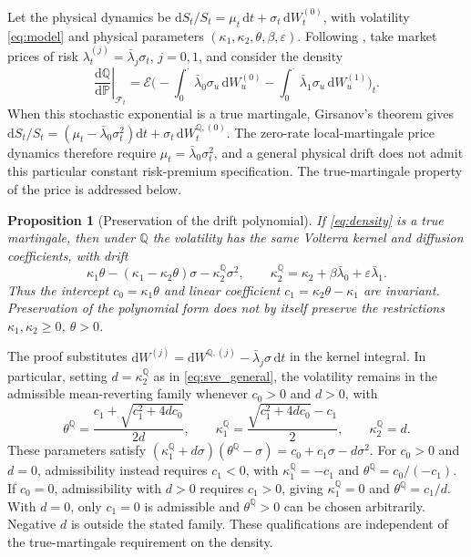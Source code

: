 \documentclass[11pt,a4paper]{article}
\newtheorem{proposition}[theorem]{Proposition}
\theoremstyle{definition}
\newcommand{\D}{\mathrm{d}}
\newcommand{\Q}{\mathbb{Q}}
\renewcommand{\P}{\mathbb{P}}
\newcommand{\F}{\mathcal{F}}
\begin{document}
Let the physical dynamics be $\D S_t/S_t=\mu_t\,\D t+\sigma_t\,\D W^{(0)}_t$, with volatility \eqref{eq:model} and physical parameters $(\kappa_1,\kappa_2,\theta,\beta,\varepsilon)$. Following \citet{SeppRakhmonov2023}, take market prices of risk $\lambda^{(j)}_t=\bar\lambda_j\sigma_t$, $j=0,1$, and consider the density
\begin{equation}\label{eq:density}
\left.\frac{\D\Q}{\D\P}\right|_{\F_t}=\mathcal{E}\Big(-\int_0^\cdot\bar\lambda_0\sigma_u\,\D W^{(0)}_u-\int_0^\cdot\bar\lambda_1\sigma_u\,\D W^{(1)}_u\Big)_t .
\end{equation}
When this stochastic exponential is a true martingale, Girsanov's theorem gives
$\D S_t/S_t=(\mu_t-\bar\lambda_0\sigma_t^2)\D t+\sigma_t\,\D W^{\Q,(0)}_t$.
The zero-rate local-martingale price dynamics therefore require $\mu_t=\bar\lambda_0\sigma_t^2$, and a general physical drift does not admit this particular constant risk-premium specification. The true-martingale property of the price is addressed below.

\begin{proposition}[Preservation of the drift polynomial]\label{prop:closure}
If \eqref{eq:density} is a true martingale, then under $\Q$ the volatility has the same Volterra kernel and diffusion coefficients, with drift
\begin{equation}\label{eq:drift_Q}
\kappa_1\theta-(\kappa_1-\kappa_2\theta)\sigma-\kappa_2^{\Q}\sigma^2,\qquad \kappa_2^{\Q}=\kappa_2+\beta\bar\lambda_0+\varepsilon\bar\lambda_1 .
\end{equation}
Thus the intercept $c_0=\kappa_1\theta$ and linear coefficient $c_1=\kappa_2\theta-\kappa_1$ are invariant. Preservation of the polynomial form does not by itself preserve the restrictions $\kappa_1,\kappa_2\ge0$, $\theta>0$.
\end{proposition}

The proof substitutes $\D W^{(j)}=\D W^{\Q,(j)}-\bar\lambda_j\sigma\,\D t$ in the kernel integral. In particular, setting $d=\kappa_2^{\Q}$ as in \eqref{eq:sve_general}, the volatility remains in the admissible mean-reverting family whenever $c_0>0$ and $d>0$, with
\begin{equation*}
\theta^{\Q}=\frac{c_1+\sqrt{c_1^2+4dc_0}}{2d},\qquad
\kappa_1^{\Q}=\frac{\sqrt{c_1^2+4dc_0}-c_1}{2},\qquad
\kappa_2^{\Q}=d.
\end{equation*}
These parameters satisfy $(\kappa_1^{\Q}+d\sigma)(\theta^{\Q}-\sigma)=c_0+c_1\sigma-d\sigma^2$.
For $c_0>0$ and $d=0$, admissibility instead requires $c_1<0$, with $\kappa_1^{\Q}=-c_1$ and $\theta^{\Q}=c_0/(-c_1)$. If $c_0=0$, admissibility with $d>0$ requires $c_1>0$, giving $\kappa_1^{\Q}=0$ and $\theta^{\Q}=c_1/d$. With $d=0$, only $c_1=0$ is admissible and $\theta^{\Q}>0$ can be chosen arbitrarily. Negative $d$ is outside the stated family. These qualifications are independent of the true-martingale requirement on the density.
\end{document}
